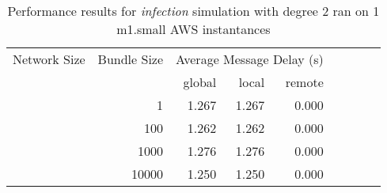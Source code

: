 \clearpage


	    

\begin{table}
	  \caption[Performance results, \emph{infection:2 on 1 m1.small instances }]{ Performance results for \emph{ infection } simulation with degree 2 ran on 1 m1.small AWS instantances }
	\begin{tabular}{rrrrrrrrr}
	\hline\noalign{\smallskip}

	Network Size &
	Bundle Size &
	\multicolumn{3}{c}{Average Message Delay (s)}  \\

	 & 
     & global & local & remote\\

			
				\noalign{\smallskip}\hline
				\multirow{ 4 }{*}{ 40000 } &
				
					
					 
					\multirow{ 1 }{*}{ 1 } &
					
						
							    
							    
	                           1.267 & 1.267 & 0.000  \\
	                
	            
					 &  
					 
					\multirow{ 1 }{*}{ 100 } &
					
						
							    
							    
	                           1.262 & 1.262 & 0.000  \\
	                
	            
					 &  
					 
					\multirow{ 1 }{*}{ 1000 } &
					
						
							    
							    
	                           1.276 & 1.276 & 0.000  \\
	                
	            
					 &  
					 
					\multirow{ 1 }{*}{ 10000 } &
					
						
							    
							    
	                           1.250 & 1.250 & 0.000  \\
	                
	            
	        

\end{tabular}
\end{table}
